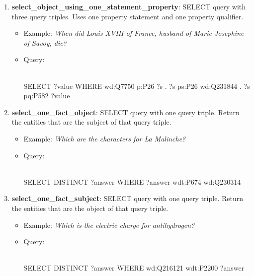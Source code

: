 \begin{enumerate}
    \item \textbf{select\_object\_using\_one\_statement\_property}: SELECT query with three query 
    triples. Uses one property statement and one property qualifier. 
    \begin{itemize}
        \item Example: \textit{When did Louis XVIII of France, husband of Marie Josephine of Savoy, 
        die?}
        \item Query:\\
        \mbox{}\\
        \begin{sparqlcode}[]
SELECT ?value WHERE { 
    wd:Q7750 p:P26 ?s . 
    ?s ps:P26 wd:Q231844 . 
    ?s pq:P582 ?value
}
        \end{sparqlcode}
    \end{itemize}
    
    \item \textbf{select\_one\_fact\_object}: SELECT query with one query triple. Return the entities 
    that are the subject of that query triple.
    \begin{itemize}
        \item Example: \textit{Which are the characters for La Malinche?}
        \item Query:\\
        \mbox{}\\
        \begin{sparqlcode}[]
SELECT DISTINCT ?answer WHERE { 
    ?answer wdt:P674 wd:Q230314
}
        \end{sparqlcode}
    \end{itemize}
    
    \item \textbf{select\_one\_fact\_subject}: SELECT query with one query triple. Return the entities 
    that are the object of that query triple.
    \begin{itemize}
        \item Example: \textit{Which is the electric charge for antihydrogen?}
        \item Query:\\
        \mbox{}\\
        \begin{sparqlcode}[]
SELECT DISTINCT ?answer WHERE { 
    wd:Q216121 wdt:P2200 ?answer
}
        \end{sparqlcode}
    \end{itemize}
    

\end{enumerate}
